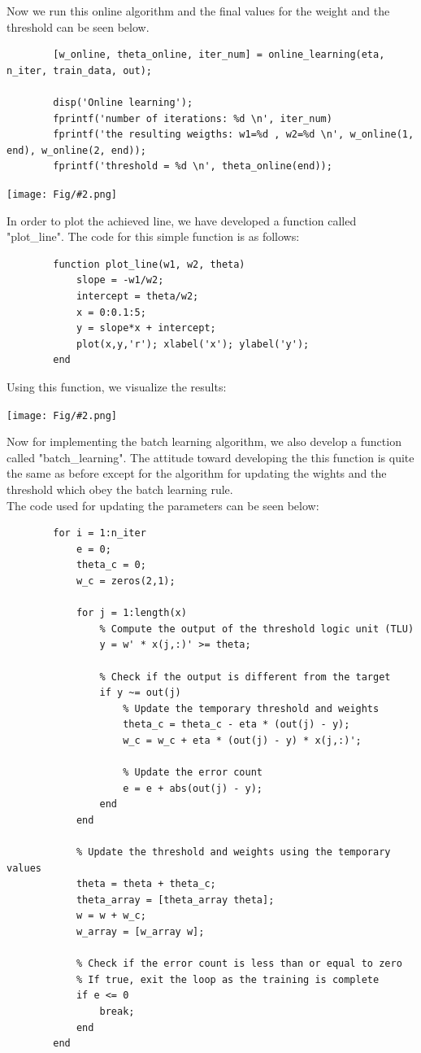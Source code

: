 \documentclass[]{article}
\newcommand{\pict}[2]{\begin{center}
		\texttt{[image: Fig/\#2.png]}
\end{center}}
\begin{document}
	Now we run this online algorithm and the final values for the weight and the threshold can be seen below.
	\begin{lstlisting}
		[w_online, theta_online, iter_num] = online_learning(eta, n_iter, train_data, out);
		
		disp('Online learning');
		fprintf('number of iterations: %d \n', iter_num)
		fprintf('the resulting weigths: w1=%d , w2=%d \n', w_online(1, end), w_online(2, end));
		fprintf('threshold = %d \n', theta_online(end));
	\end{lstlisting}
	\pict{1}{Q2_F2}
	In order to plot the achieved line, we have developed a function called "plot\_line". The code for this simple function is as follows:
	\begin{lstlisting}
		function plot_line(w1, w2, theta)
			slope = -w1/w2;
			intercept = theta/w2;
			x = 0:0.1:5;
			y = slope*x + intercept;
			plot(x,y,'r'); xlabel('x'); ylabel('y');
		end
	\end{lstlisting}
	Using this function, we visualize the results:
	\pict{0.45}{Q2_F3}
	Now for implementing the batch learning algorithm, we also develop a function called "batch\_learning". The attitude toward developing the this function is quite the same as before except for the algorithm for updating the wights and the threshold which obey the batch learning rule.\\
	The code used for updating the parameters can be seen below:
	\begin{lstlisting}
		for i = 1:n_iter
			e = 0;
			theta_c = 0;
			w_c = zeros(2,1);
			
			for j = 1:length(x)
				% Compute the output of the threshold logic unit (TLU)
				y = w' * x(j,:)' >= theta;
				
				% Check if the output is different from the target
				if y ~= out(j)
					% Update the temporary threshold and weights
					theta_c = theta_c - eta * (out(j) - y);
					w_c = w_c + eta * (out(j) - y) * x(j,:)';
					
					% Update the error count
					e = e + abs(out(j) - y);
				end
			end
			
			% Update the threshold and weights using the temporary values
			theta = theta + theta_c;
			theta_array = [theta_array theta];
			w = w + w_c;
			w_array = [w_array w];
			
			% Check if the error count is less than or equal to zero
			% If true, exit the loop as the training is complete
			if e <= 0
				break;
			end
		end
	\end{lstlisting}
\end{document}
